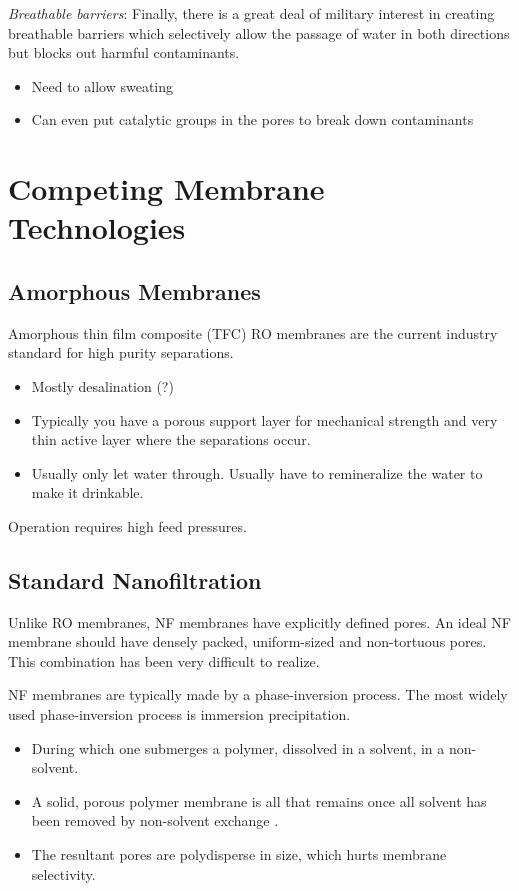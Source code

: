   \textit{Breathable barriers}:
  Finally, there is a great deal of military interest in creating breathable 
  barriers which selectively allow the passage of water in both directions but
  blocks out harmful contaminants.
  \begin{itemize}
    \item Need to allow sweating
    \item Can even put catalytic groups in the pores to break down contaminants
  \end{itemize}

  \section{Competing Membrane Technologies}

  \subsection{Amorphous Membranes}
  
  Amorphous thin film composite (TFC) RO membranes are the current industry standard for
  high purity separations.
  \begin{itemize}  
    \item Mostly desalination (?)
    \item Typically you have a porous support layer for mechanical strength and 
    very thin active layer where the separations occur.
    \item Usually only let water through. Usually have to remineralize the
    water to make it drinkable.
  \end{itemize}
  
  Operation requires high feed pressures.
  
  \subsection{Standard Nanofiltration}

  Unlike RO membranes, NF membranes have explicitly defined pores. An
  ideal NF membrane should have densely packed, uniform-sized and
  non-tortuous pores. This combination has been very difficult to realize.
  
  NF membranes are typically made by a phase-inversion process. The most 
  widely used phase-inversion process is immersion precipitation.
  \begin{itemize}
    \item During which one submerges a polymer, dissolved in a solvent, in
    a non-solvent.
    \item A solid, porous polymer membrane is all that remains once all
    solvent has been removed by non-solvent exchange \cite{smolders_microstructures_1992}.
    \item The resultant pores are polydisperse in size, which hurts membrane selectivity. 
  \end{itemize}    
    
